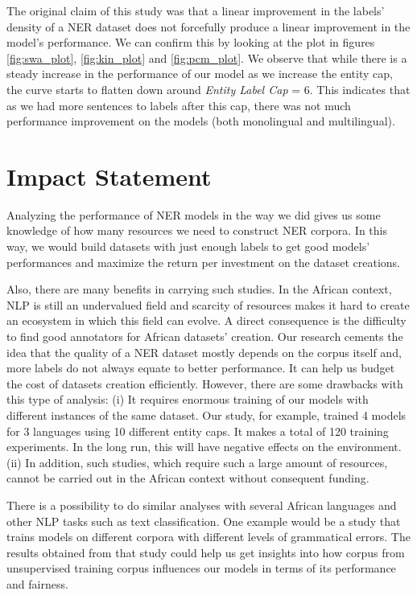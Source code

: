 \documentclass[11pt,a4paper]{article}
\begin{document}
The original claim of this study was that a linear improvement in the labels' density of a NER dataset does not forcefully produce a linear improvement in the model's performance. We can confirm this by looking at the plot in figures \ref{fig:swa_plot}, \ref{fig:kin_plot} and \ref{fig:pcm_plot}. We observe that while there is a steady increase in the performance of our model as we increase the entity cap, the curve starts to flatten down around \textit{Entity Label Cap} = 6. This indicates that as we had more sentences to labels after this cap, there was not much performance improvement on the models (both monolingual and multilingual).

\section{Impact Statement}
Analyzing the performance of NER models in the way we did gives us some knowledge of how many resources we need to construct NER corpora. In this way, we would build datasets with just enough labels to get good models' performances and maximize the return per investment on the dataset creations.

Also, there are many benefits in carrying such studies. In the African context, NLP is still an undervalued field and scarcity of resources makes it hard to create an ecosystem in which this field can evolve. A direct consequence is the difficulty to find good annotators for African datasets' creation. Our research cements the idea that the quality of a NER dataset mostly depends on the corpus itself and, more labels do not always equate to better performance. It can help us budget the cost of datasets creation efficiently. However, there are some drawbacks with this type of analysis: (i) It requires enormous training of our models with different instances of the same dataset. Our study, for example, trained 4 models for 3 languages using 10 different entity caps. It makes a total of 120 training experiments. In the long run, this will have negative effects on the environment. (ii) In addition, such studies, which require such a large amount of resources, cannot be carried out in the African context without consequent funding.

There is a possibility to do similar analyses with several African languages and other NLP tasks such as text classification. One example would be a study that trains models on different corpora with different levels of grammatical errors. The results obtained from that study could help us get insights into how corpus from unsupervised training corpus influences our models in terms of its performance and fairness.
\end{document}
